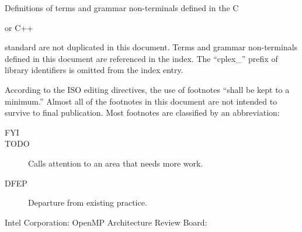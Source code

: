 \documentclass[
	techspec,	%
	final,		%
	notcopyright,	%
	letterpaper	%
	]{isov2}
\begin{document}
\pnum
Definitions of terms and grammar non-terminals defined in the C
\begin{cpp}
or C++
\end{cpp}
standard are not duplicated in this document.
Terms and grammar non-terminals defined in this document
are referenced in the index.
The ``cplex_'' prefix of library identifiers
is omitted from the index entry.

\pnum
According to the ISO editing directives,
the use of footnotes
``shall be kept to a minimum.''
Almost all of the footnotes in this document
are not intended to survive to final publication.
Most footnotes are classified by an abbreviation:
\begin{description}
\item[FYI]
\item[TODO]
Calls attention to an area that needs more work.
\item[DFEP]
Departure from existing practice.
\end{description}

\begin{comment}
\pnum
Annex A contains information
concerning the editing of the LaTeX source of this document.
It will not survive to final publication.
\end{comment}














\bibannex
\begin{references}
{Intel Corporation}:
{OpenMP Architecture Review Board}:
\end{references}

\twocolumn %
\printindex
\end{document}
